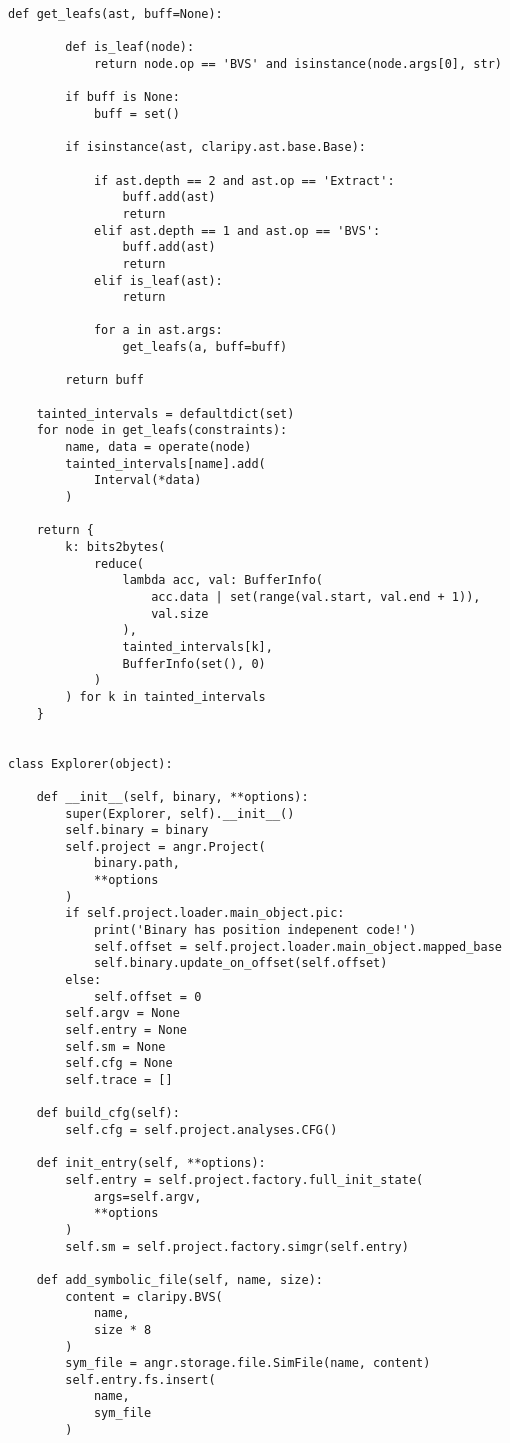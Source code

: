 \begin{lstlisting}[environoment=py_code, caption=an, captionpos=b]
    def get_leafs(ast, buff=None):

        def is_leaf(node):
            return node.op == 'BVS' and isinstance(node.args[0], str)

        if buff is None:
            buff = set()

        if isinstance(ast, claripy.ast.base.Base):

            if ast.depth == 2 and ast.op == 'Extract':
                buff.add(ast)
                return
            elif ast.depth == 1 and ast.op == 'BVS':
                buff.add(ast)
                return
            elif is_leaf(ast):
                return

            for a in ast.args:
                get_leafs(a, buff=buff)

        return buff

    tainted_intervals = defaultdict(set)
    for node in get_leafs(constraints):
        name, data = operate(node)
        tainted_intervals[name].add(
            Interval(*data)
        )

    return {
        k: bits2bytes(
            reduce(
                lambda acc, val: BufferInfo(
                    acc.data | set(range(val.start, val.end + 1)),
                    val.size
                ),
                tainted_intervals[k],
                BufferInfo(set(), 0)
            )
        ) for k in tainted_intervals
    }


class Explorer(object):

    def __init__(self, binary, **options):
        super(Explorer, self).__init__()
        self.binary = binary
        self.project = angr.Project(
            binary.path,
            **options
        )
        if self.project.loader.main_object.pic:
            print('Binary has position indepenent code!')
            self.offset = self.project.loader.main_object.mapped_base
            self.binary.update_on_offset(self.offset)
        else:
            self.offset = 0
        self.argv = None
        self.entry = None
        self.sm = None
        self.cfg = None
        self.trace = []

    def build_cfg(self):
        self.cfg = self.project.analyses.CFG()

    def init_entry(self, **options):
        self.entry = self.project.factory.full_init_state(
            args=self.argv,
            **options
        )
        self.sm = self.project.factory.simgr(self.entry)

    def add_symbolic_file(self, name, size):
        content = claripy.BVS(
            name,
            size * 8
        )
        sym_file = angr.storage.file.SimFile(name, content)
        self.entry.fs.insert(
            name,
            sym_file
        )


\end{lstlisting}
